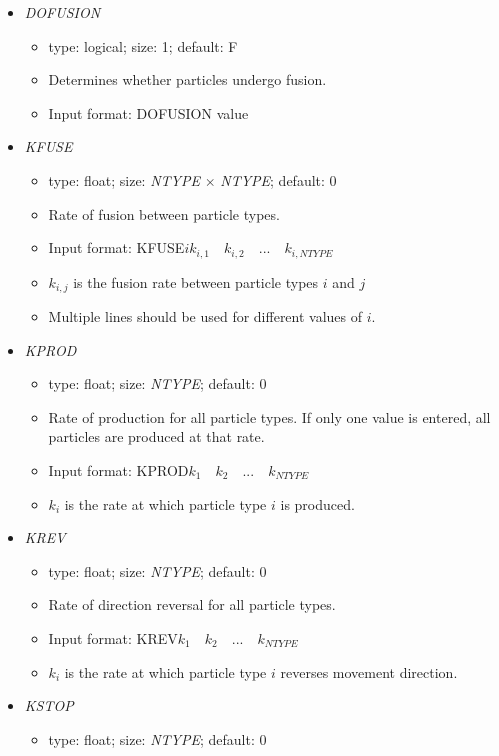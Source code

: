 \documentclass[12pt]{article}
\begin{document}
\begin{itemize}
\begin{itemize}
  \end{itemize}
%
\item {\it DOFUSION}
  \begin{itemize}
   	\item  type: logical; size: 1; default: F
   	\item Determines whether particles undergo fusion.
   	\item Input format: DOFUSION value
  \end{itemize}
%
\item {\it KFUSE}
	\begin{itemize}
		\item  type: float; size: \textit{NTYPE} $\times$ \textit{NTYPE}; default: 0
		\item Rate of fusion between particle types.
		\item Input format: KFUSE\quad$i$\quad$k_{i,1}\quad k_{i,2}\quad...\quad k_{i,NTYPE}$
		\item $k_{i,j}$ is the fusion rate between particle types $i$ and $j$
		\item Multiple lines should be used for different values of $i$.
	\end{itemize}
%
\item {\it KPROD}
	\begin{itemize}
		\item  type: float; size: \textit{NTYPE}; default: 0
		\item Rate of production for all particle types. If only one value is entered, all particles are produced at that rate. 
		\item Input format: KPROD\quad$k_{1}\quad k_{2}\quad...\quad k_{NTYPE}$
		\item $k_{i}$ is the rate at which particle type $i$ is produced.
	\end{itemize} 
%
\item {\it KREV}
	\begin{itemize}
		\item  type: float; size: \textit{NTYPE}; default: 0
		\item Rate of direction reversal for all particle types. 
		\item Input format: KREV\quad$k_{1}\quad k_{2}\quad...\quad k_{NTYPE}$
		\item $k_{i}$ is the rate at which particle type $i$ reverses movement direction.
	\end{itemize}
%
\item {\it KSTOP}
	\begin{itemize}
		\item  type: float; size: \textit{NTYPE}; default: 0

\end{itemize}
\end{itemize}
\end{document}
